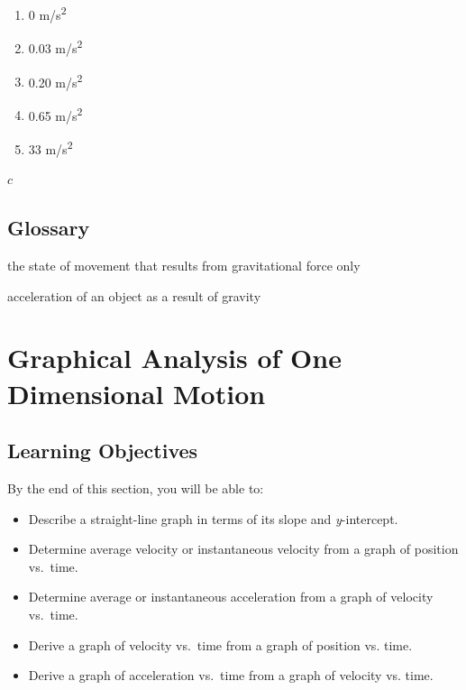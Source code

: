 \documentclass[
]{book}
\providecommand{\tightlist}{%
  \setlength{\itemsep}{0pt}\setlength{\parskip}{0pt}}
\begin{document}
\begin{enumerate}
\def\labelenumi{\alph{enumi}.}
\tightlist
\item
  0 m/s\textsuperscript{2}
\item
  0.03 m/s\textsuperscript{2}
\item
  0.20 m/s\textsuperscript{2}
\item
  0.65 m/s\textsuperscript{2}
\item
  33 m/s\textsuperscript{2}
\end{enumerate}

\leavevmode{}%
\(c\)

\hypertarget{glossary-4}{%
\subsection{Glossary}\label{glossary-4}}

\begin{description}
\tightlist
\item[free-fall]
the state of movement that results from gravitational force only
\end{description}

\begin{description}
\tightlist
\item[acceleration due to gravity]
acceleration of an object as a result of gravity
\end{description}

\hypertarget{graphical-analysis-of-one-dimensional-motion}{%
\section{Graphical Analysis of One Dimensional Motion}\label{graphical-analysis-of-one-dimensional-motion}}

\hypertarget{fs-id1367279}{}
\hypertarget{learning-objectives-6}{%
\subsection{Learning Objectives}\label{learning-objectives-6}}

By the end of this section, you will be able to:

\begin{itemize}
\tightlist
\item
  Describe a straight-line graph in terms of its slope and
  \emph{y}-intercept.
\item
  Determine average velocity or instantaneous velocity from a graph of
  position vs.~time.
\item
  Determine average or instantaneous acceleration from a graph of
  velocity vs.~time.
\item
  Derive a graph of velocity vs.~time from a graph of position vs.
  time.
\item
  Derive a graph of acceleration vs.~time from a graph of velocity vs.
  time.
\end{itemize}
\end{document}
